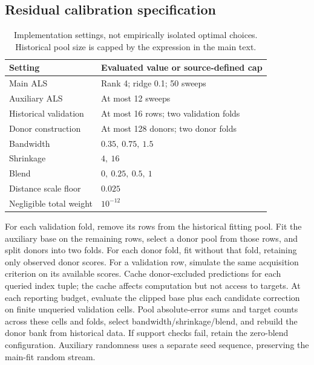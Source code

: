\documentclass{article}
\begin{document}
\subsection{Residual calibration specification}
\begin{table}[h]
\centering
\begin{tabular}{ll}
\toprule
Setting & Evaluated value or source-defined cap \\
\midrule
Main ALS & Rank 4; ridge 0.1; 50 sweeps \\
Auxiliary ALS & At most 12 sweeps \\
Historical validation & At most 16 rows; two validation folds \\
Donor construction & At most 128 donors; two donor folds \\
Bandwidth & $0.35,\ 0.75,\ 1.5$ \\
Shrinkage & $4,\ 16$ \\
Blend & $0,\ 0.25,\ 0.5,\ 1$ \\
Distance scale floor & $0.025$ \\
Negligible total weight & $10^{-12}$ \\
\bottomrule
\end{tabular}
\caption{Implementation settings, not empirically isolated optimal choices. Historical pool size is capped by the expression in the main text.}
\label{tab:settings}
\end{table}

For each validation fold, remove its rows from the historical fitting pool. Fit the auxiliary base on the remaining rows, select a donor pool from those rows, and split donors into two folds. For each donor fold, fit without that fold, retaining only observed donor scores. For a validation row, simulate the same acquisition criterion on its available scores. Cache donor-excluded predictions for each queried index tuple; the cache affects computation but not access to targets. At each reporting budget, evaluate the clipped base plus each candidate correction on finite unqueried validation cells. Pool absolute-error sums and target counts across these cells and folds, select bandwidth/shrinkage/blend, and rebuild the donor bank from historical data. If support checks fail, retain the zero-blend configuration. Auxiliary randomness uses a separate seed sequence, preserving the main-fit random stream.
\end{document}
